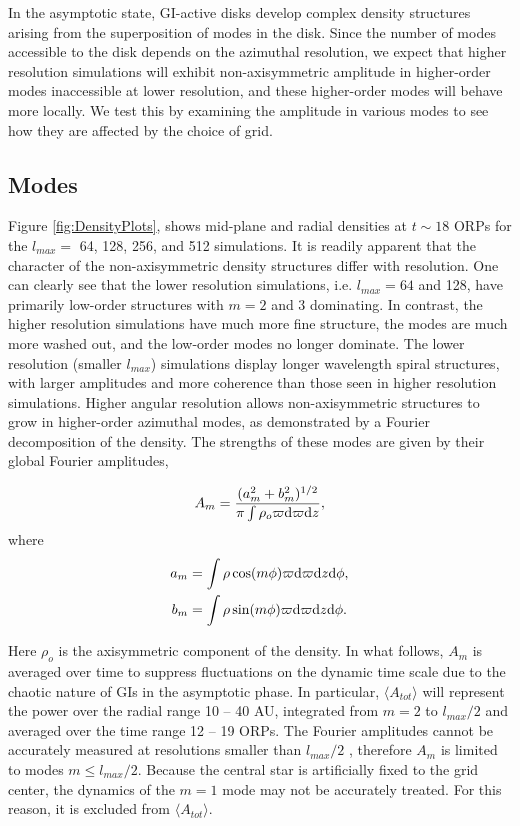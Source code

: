 \documentclass[manuscript]{aastex}
\begin{document}
In the asymptotic state, GI-active disks develop complex density structures arising from the superposition of
modes in the disk.  Since the number of modes accessible to the disk depends on the azimuthal resolution, we expect that higher resolution simulations will exhibit non-axisymmetric amplitude in higher-order modes inaccessible at lower resolution, and these higher-order modes will 
behave more locally. We test this by examining the amplitude in various modes to see how they are affected by the choice of grid.

\subsection{Modes}
	
Figure \ref{fig:DensityPlots}, shows mid-plane and radial densities  at $t \sim 18$ ORPs for the $l_{max} =$ 64, 128, 256, and 512 simulations. It is readily apparent that the character of the non-axisymmetric density structures differ with 
resolution. One can clearly see that the lower resolution simulations, i.e. $l_{max} = 64$ and 128, have primarily low-order structures with $m = 2$ and 3 dominating. In contrast, the higher resolution simulations have much more fine structure, the modes are much more washed out, and the low-order modes no longer dominate.
The lower resolution (smaller $l_{max}$) simulations display longer wavelength spiral structures, with larger amplitudes and more coherence than those seen in higher resolution simulations. Higher angular resolution allows non-axisymmetric structures to grow in higher-order azimuthal modes, as demonstrated by a Fourier decomposition of the density. The strengths of these modes are given by their global Fourier amplitudes,

\begin{equation}
A_m = \frac{(a_m^2 + b_m^2)^{1/2}}{\pi\int\rho_o \varpi {\rm d}\varpi {\rm d}z},
\end{equation}
where
\begin{subequations}
\begin{align}
a_m &= \int \rho \cos(m\phi)\varpi {\rm d}\varpi {\rm d}z {\rm d}\phi,\\
b_m &=\int \rho \sin(m\phi)\varpi {\rm d}\varpi {\rm d}z {\rm d}\phi.
\end{align}
\end{subequations}


Here  $\rho_o$ is the axisymmetric component of the density. In what follows, $A_m$ is averaged over time to suppress fluctuations on the dynamic time scale due to the chaotic nature of GIs in the asymptotic  phase.
In particular, $\langle A_{tot} \rangle$ will represent the power over the radial range 10 -- 40 AU, integrated from $ m = 2$ to $l_{max}/2$ and averaged over the time range 12 -- 19 ORPs. The Fourier amplitudes cannot be accurately measured at resolutions smaller than $l_{max}/2$ \citep{shannon1984}, therefore $A_m$ is limited to modes $m \le l_{max}/2$.  
Because the central star is artificially fixed to the grid center, the dynamics of the $m=1$ mode may not
be accurately treated. For this reason, it is excluded from $\langle A_{tot} \rangle$.
\end{document}
